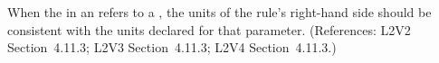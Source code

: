 When the  in an \AssignmentRule refers to a \Parameter, the
units of the rule's right-hand side should be consistent with the units
declared for that parameter.  (References: L2V2 Section~4.11.3;
L2V3 Section~4.11.3; L2V4 Section~4.11.3.)
